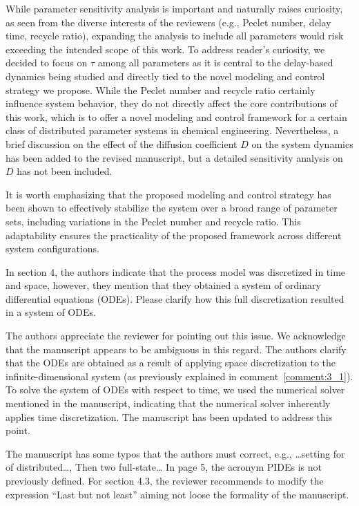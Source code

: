 \documentclass[11pt,answers]{exam}
\begin{document}
\begin{questions}
\begin{solutionorbox}
        While parameter sensitivity analysis is important and naturally raises curiosity, as seen from the diverse interests of the reviewers (e.g., Peclet number, delay time, recycle ratio), expanding the analysis to include all parameters would risk exceeding the intended scope of this work. To address reader's curiosity, we decided to focus on \( \tau \) among all parameters as it is central to the delay-based dynamics being studied and directly tied to the novel modeling and control strategy we propose. While the Peclet number and recycle ratio certainly influence system behavior, they do not directly affect the core contributions of this work, which is to offer a novel modeling and control framework for a certain class of distributed parameter systems in chemical engineering. Nevertheless, a brief discussion on the effect of the diffusion coefficient $D$ on the system dynamics has been added to the revised manuscript, but a detailed sensitivity analysis on \( D \) has not been included.
    
        It is worth emphasizing that the proposed modeling and control strategy has been shown to effectively stabilize the system over a broad range of parameter sets, including variations in the Peclet number and recycle ratio. This adaptability ensures the practicality of the proposed framework across different system configurations.
    \end{solutionorbox}


    \question In section 4, the authors indicate that the process model was discretized in time and space, however, they mention that they obtained a system of ordinary differential equations (ODEs). Please clarify how this full discretization resulted in a system of ODEs.

    \begin{solutionorbox} \label{comment:3_4}
        The authors appreciate the reviewer for pointing out this issue. We acknowledge that the manuscript appears to be ambiguous in this regard. The authors clarify that the ODEs are obtained as a result of applying space discretization to the infinite-dimensional system (as previously explained in comment~\ref{comment:3_1}). To solve the system of ODEs with respect to time, we used the numerical solver mentioned in the manuscript, indicating that the numerical solver inherently applies time discretization. The manuscript has been updated to address this point.
    \end{solutionorbox}

    \question The manuscript has some typos that the authors must correct, e.g., …setting for of distributed…, Then two full-state… In page 5, the acronym PIDEs is not previously defined. For section 4.3, the reviewer recommends to modify the expression “Last but not least” aiming not loose the formality of the manuscript.


\end{questions}
\end{document}
